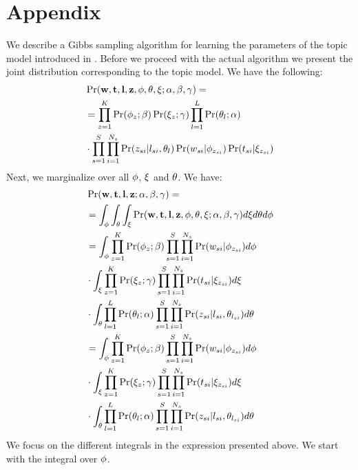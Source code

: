 \documentclass[twoside,leqno,twocolumn]{article}
\newcommand{\w}{{\bf w}}
\newcommand{\z}{{\bf z}}
\newcommand{\loc}{{\bf l}}
\newcommand{\tim}{{\bf t}}
\begin{document}
\section{Appendix}
\label{sec:gibbs}
We describe a Gibbs sampling algorithm for learning the parameters of the topic model introduced in . Before we proceed with the actual algorithm we present the joint distribution corresponding to the topic model. We have the following:
\begin{align}
&\Pr(\w,\tim,\loc,\z,{\bf \phi},{\bf \theta},{\bf \xi};\alpha,\beta,\gamma) =  \nonumber \\
&=\prod_{z = 1}^{K}\Pr(\phi_z;\beta)\Pr(\xi_z;\gamma) \prod_{l = 1}^{L}\Pr(\theta_l;\alpha) \nonumber \\
& \cdot \prod_{s = 1}^{S}\prod_{i = 1}^{N_s} \Pr(z_{si}|l_{si},\theta_l)\Pr(w_{si}|\phi_{z_{si}})\Pr(t_{si}|\xi_{z_{si}}) \nonumber
\end{align}
Next, we marginalize over all ${\bf \phi}$, ${\bf \xi}$ and ${\bf \theta}$. We have:
\begin{align}
&\Pr(\w,\tim,\loc,\z;\alpha,\beta,\gamma) = \nonumber \\
&=\int_{\phi}\int_{\theta}\int_{\xi} \Pr(\w,\tim,\loc,\z,{\bf \phi},{\bf \theta},{\bf \xi};\alpha,\beta,\gamma) d\xi d\theta d\phi \nonumber \\
&=\int_{\phi} \prod_{z = 1}^{K}\Pr(\phi_z;\beta) \prod_{s = 1}^{S}\prod_{i = 1}^{N_s}\Pr(w_{si}|\phi_{z_{si}}) d\phi \nonumber \\
& \cdot \int_{\xi} \prod_{z = 1}^{K} \Pr(\xi_z;\gamma)\prod_{s = 1}^{S}\prod_{i = 1}^{N_s}\Pr(t_{si}|\xi_{z_{si}}) d\xi \nonumber \\
&\cdot \int_{\theta} \prod_{l = 1}^{L}\Pr(\theta_l;\alpha)\prod_{s = 1}^{S}\prod_{i = 1}^{N_s}\Pr(z_{si}|l_{si},\theta_{l_{si}})d\theta \nonumber \\
&=\int_{\phi} \prod_{z = 1}^{K}\Pr(\phi_z;\beta) \prod_{s = 1}^{S}\prod_{i = 1}^{N_s}\Pr(w_{si}|\phi_{z_{si}}) d\phi \nonumber \\
&  \cdot \int_{\xi} \prod_{z = 1}^{K} \Pr(\xi_z;\gamma)\prod_{s = 1}^{S}\prod_{i = 1}^{N_s}\Pr(t_{si}|\xi_{z_{si}}) d\xi \nonumber \\
&\cdot \int_{\theta} \prod_{l = 1}^{L}\Pr(\theta_l;\alpha)\prod_{s = 1}^{S}\prod_{i = 1}^{N_s}\Pr(z_{si}|l_{si},\theta_{l_{si}}) d\theta \nonumber
\end{align}
We focus on the different integrals in the expression presented above. We start with the integral over ${\bf \phi}$. 
\end{document}
